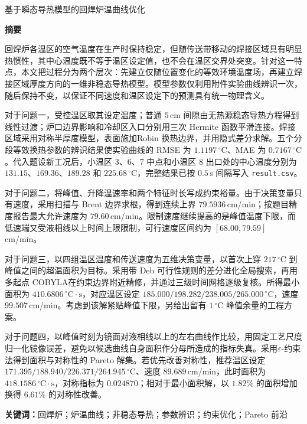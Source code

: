 \documentclass[12pt,a4paper]{ctexart}
\newcommand{\dC}{\ensuremath{^{\circ}\mathrm{C}}}
\newcommand{\keywords}[1]{\par\vspace{0.7em}\noindent\textbf{关键词：}#1}
\newcommand{\abskey}[1]{{\heiti\boldmath #1}}
\begin{document}
\begin{center}
  {\heiti{} 基于瞬态导热模型的回焊炉温曲线优化}
\end{center}
\vspace{0.5em}

\begin{center}\textbf{摘\quad 要}\end{center}
\vspace{-0.2em}

{\small
\setlength{\parindent}{2em}
\linespread{1.08}\selectfont

回焊炉各温区的空气温度在生产时保持稳定，但随传送带移动的焊接区域具有明显热惯性，其中心温度既不等于温区设定值，也不会在温区交界处突变。针对这一特点，本文把过程分为两个层次：先建立仅随位置变化的\abskey{等效环境温度场}，再建立焊接区域厚度方向的\abskey{一维非稳态导热模型}。模型参数\abskey{仅利用附件实验曲线辨识一次}，随后保持不变，以保证不同速度和温区设定下的预测具有统一物理含义。

对于问题一，受控温区取其设定温度；普通 $5\,$cm 间隙由无热源稳态导热方程得到\abskey{线性过渡}；炉口边界影响和冷却区入口分别用\abskey{三次 Hermite 函数}平滑连接。焊接区域采用对称半厚度模型，表面施加\abskey{Robin 换热边界}，并用隐式差分求解。五个分段等效换热参数的辨识结果使实验曲线的 \abskey{RMSE 为 $1.1197\,\dC$}、MAE 为 $0.7167\,\dC$。代入题设新工况后，小温区 3、6、7 中点和小温区 8 出口处的中心温度分别为 $131.15$、$169.36$、$189.28$ 和 $225.68\,\dC$，完整结果已按 $0.5\,$s 间隔写入 \texttt{result.csv}。

对于问题二，将峰值、升降温速率和两个特征时长写成\abskey{约束裕量}。由于决策变量只有速度，采用\abskey{扫描与 Brent 边界求根}，得到连续上界 $79.5936\,$cm/min；按题目精度报告\abskey{最大允许速度为 $79.60\,$cm/min}。限制速度继续提高的是峰值温度下限，而低速端又受液相线以上时间上限限制，可行速度区间约为 $[68.00,79.59]\,$cm/min。

对于问题三，以四组温区温度和传送速度为\abskey{五维决策变量}，以首次上穿 $217\,\dC$ 到峰值之间的超温面积为目标。采用带 Deb 可行性规则的\abskey{差分进化全局搜索}，再用\abskey{多起点 COBYLA}在约束边界附近精修，并通过三级时间网格逐级复核。所得\abskey{最小面积为 $410.6806\,\dC\!\cdot\!\mathrm s$}，对应温区设定 $185.000/198.282/238.005/265.000\,\dC$，速度 $99.507\,$cm/min。考虑到该解紧贴峰值下限，另给出留有 $1\,\dC$ 峰值余量的工程方案。

对于问题四，以峰值时刻为镜面对液相线以上的左右曲线作比较，用\abskey{固定工艺尺度归一化镜像误差}，避免以候选曲线自身面积作分母所造成的指标失真。采用\abskey{$\varepsilon$-约束法}得到面积与对称性的 Pareto 解集。若优先改善对称性，推荐温区设定 $171.395/188.940/226.371/264.945\,\dC$、速度 $89.689\,$cm/min，此时面积为 $418.1586\,\dC\!\cdot\!\mathrm s$，对称指标为 $0.024870$；相对于最小面积解，\abskey{以 $1.82\%$ 的面积增加换得 $6.61\%$ 的对称性改善}。

\keywords{回焊炉；炉温曲线；非稳态导热；参数辨识；约束优化；Pareto 前沿}
}

\newpage










\end{document}
